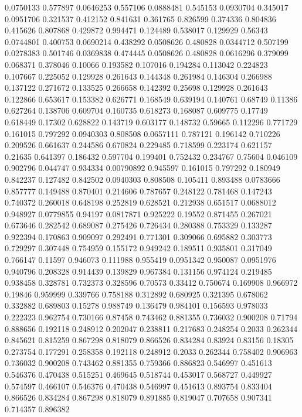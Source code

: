 0.0750133 0.577897
0.0646253 0.557106
0.0888481 0.545153
0.0930704 0.345017
0.0951706 0.321537
0.412152 0.841631
0.361765 0.826599
0.374336 0.804836
0.415626 0.807868
0.429872 0.994471
0.124489 0.538017
0.129929 0.56343
0.0744801 0.400753
0.0690214 0.438292
0.0508626 0.480828
0.0344712 0.507199
0.0278383 0.501746
0.0369838 0.474445
0.0508626 0.480828
0.0616296 0.379099
0.068371 0.378046
0.10066 0.193582
0.107016 0.194284
0.113042 0.224823
0.107667 0.225052
0.129928 0.261643
0.144348 0.261984
0.146304 0.266988
0.137122 0.271672
0.133525 0.266658
0.142392 0.25698
0.129928 0.261643
0.122866 0.653617
0.153382 0.626771
0.168549 0.639194
0.140761 0.68749
0.11386 0.627264
0.138706 0.609704
0.160735 0.618273
0.168087 0.609775
0.17749 0.618449
0.17302 0.628822
0.143719 0.603177
0.148732 0.59665
0.112296 0.771729
0.161015 0.797292
0.0940303 0.808508
0.0657111 0.787121
0.196142 0.710226
0.209526 0.661637
0.244586 0.670824
0.229485 0.718599
0.223174 0.621157
0.21635 0.641397
0.186432 0.597704
0.199401 0.752432
0.234767 0.75604
0.046109 0.902796
0.044747 0.934334
0.00790892 0.945597
0.161015 0.797292
0.180949 0.842237
0.127482 0.842502
0.0940303 0.808508
0.105411 0.893488
0.0783666 0.857777
0.149488 0.870401
0.214606 0.787657
0.248122 0.781468
0.147243 0.740372
0.260018 0.648198
0.252819 0.628521
0.212938 0.651517
0.0688012 0.948927
0.0779855 0.94197
0.0817871 0.925222
0.19552 0.871455
0.267021 0.673646
0.282542 0.689087
0.275426 0.726434
0.280388 0.753329
0.133287 0.922394
0.170863 0.909097
0.292491 0.771301
0.309066 0.695882
0.303773 0.729297
0.307448 0.754959
0.155172 0.949242
0.189511 0.935801
0.317049 0.766147
0.11597 0.946073
0.111988 0.955419
0.0951342 0.950087
0.0951976 0.940796
0.208328 0.914439
0.139829 0.967384
0.131156 0.974124
0.219485 0.938458
0.328781 0.732373
0.328596 0.70573
0.33412 0.750674
0.169908 0.966972
0.19846 0.959999
0.339766 0.758188
0.312892 0.680925
0.321395 0.678062
0.332882 0.689803
0.15278 0.988749
0.136479 0.984101
0.156593 0.978033
0.222323 0.962754
0.730166 0.87458
0.743462 0.881355
0.736032 0.900208
0.71794 0.888656
0.192118 0.248912
0.202047 0.238811
0.217683 0.248254
0.2033 0.262344
0.845621 0.815259
0.867298 0.818079
0.866526 0.834284
0.83924 0.83156
0.18305 0.273754
0.177291 0.258358
0.192118 0.248912
0.2033 0.262344
0.758402 0.906963
0.736032 0.900208
0.743462 0.881355
0.759366 0.886823
0.546997 0.451613
0.546376 0.470438
0.515251 0.469645
0.518744 0.453017
0.568727 0.449927
0.574597 0.466107
0.546376 0.470438
0.546997 0.451613
0.893754 0.833404
0.866526 0.834284
0.867298 0.818079
0.891885 0.819047
0.707658 0.907341
0.714357 0.896382
